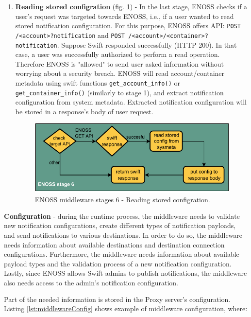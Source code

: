 \begin{enumerate}
        \item \textbf{Reading stored configration} (fig. \ref{fig:enoss-stage6}) - In the last stage, ENOSS checks if a user's request was targeted towards ENOSS, i.e., if a user wanted to read stored notification configuration. For this purpose, ENOSS offers API: \texttt{POST /<account>?notification} and \texttt{POST /<account>/<container>?notification}. Suppose Swift responded successfully (HTTP 200). In that case, a user was successfully authorized to perform a read operation. Therefore ENOSS is "allowed" to send user asked information without worrying about a security breach. ENOSS will read account/container metadata using swift functions \texttt{get\_account\_info()} or \texttt{get\_container\_info()} (similarly to stage 1), and extract notification configuration from system metadata. Extracted notification configuration will be stored in a response's body of user request.

        \begin{figure}[H]
            \centering
            \includegraphics[width=1\textwidth]{obrazky-figures/enoss-stage6.pdf}
            \caption{ENOSS middleware stages 6 - Reading stored configration.}
            \label{fig:enoss-stage6}
        \end{figure}
    \end{enumerate}

    \textbf{Configuration} - during the runtime process, the middleware needs to validate new notification configurations, create different types of notification payloads, and send notifications to various destinations. In order to do so, the middleware needs information about available destinations and destination connection configurations. Furthermore, the middleware needs information about available payload types and the validation process of a new notification configuration. Lastly, since ENOSS allows Swift admins to publish notifications, the middleware also needs access to the admin's notification configuration.

    Part of the needed information is stored in the Proxy server's configuration. Listing \ref{lst:middlewareConfig} shows example of middleware configuration, where:


